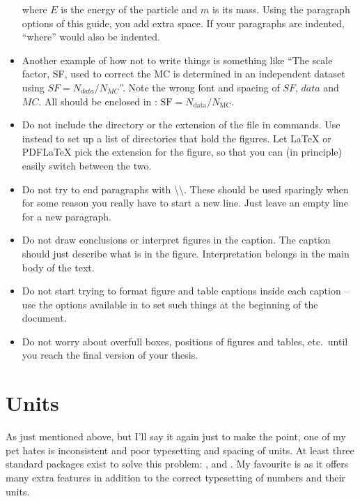 \begin{itemize}
  where $E$ is the energy of the particle and $m$ is its mass.
  Using the paragraph options of this guide, you add extra space.
  If your paragraphs are indented, \enquote{where} would also be indented.
\item Another example of how not to write things is something like
  \enquote{The scale factor, SF, used to correct the MC is determined in
  an independent dataset using $SF = N_{data} / N_{MC}$}. Note the
  wrong font and spacing of $SF$, $data$ and $MC$. All should be
  enclosed in : $\text{SF} = N_{\text{data}} / N_{\text{MC}}$.
\item Do not include the directory or the extension of the file in
  commands. Use
  instead to set up a list of directories that hold the
  figures. Let \LaTeX{} or PDF\LaTeX{} pick
  the extension for the figure, so that you can (in principle) easily
  switch between the two.
\item Do not try to end paragraphs with
  \textbackslash\textbackslash. These should be used sparingly when
  for some reason you really have to start a new line. Just leave an
  empty line for a new paragraph.
\item Do not draw conclusions or interpret figures in the caption. The
  caption should just describe what is in the figure. Interpretation
  belongs in the main body of the text.
\item Do not start trying to format figure and table captions inside
  each caption -- use the options available in \KOMAScript{} to set
  such things at the beginning of the document.
\item Do not worry about overfull boxes, positions of figures
  and tables, etc.\ until you reach the final version of your thesis.
\end{itemize}


\section{Units}
\label{sec:tips:units}

As just mentioned above, but I'll say it again just to make the point,
one of my pet hates is inconsistent and poor typesetting and spacing
of units. At least three standard packages exist to solve this
problem: ,  and . My
favourite is  as it offers many extra features in
addition to the correct typesetting of numbers and their units.

